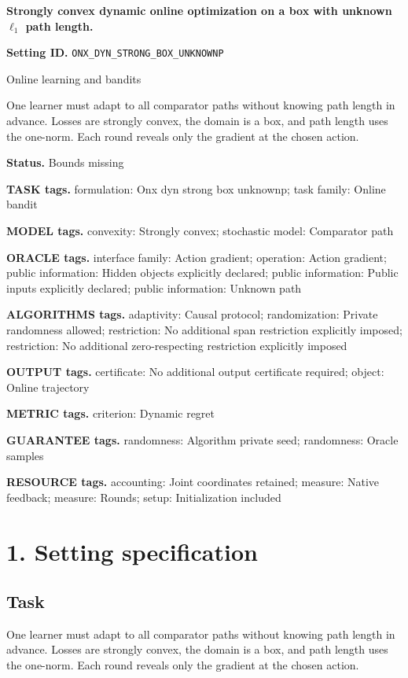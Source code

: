 \documentclass[10pt,a4paper]{article}
\begin{document}
\raggedright

{\LARGE\bfseries\sffamily\color{AtlasNavy} Strongly convex dynamic online optimization on a box with unknown $\ell _1$ path length.\par}\vspace{5pt}
\textbf{Setting ID.} \texttt{ONX\_\allowbreak{}DYN\_\allowbreak{}STRONG\_\allowbreak{}BOX\_\allowbreak{}UNKNOWNP}

Online learning and bandits

One learner must adapt to all comparator paths without knowing path length in advance. Losses are strongly convex, the domain is a box, and path length uses the one-norm. Each round reveals only the gradient at the chosen action.

\textbf{Status.} Bounds missing

\textbf{TASK tags.} formulation: Onx dyn strong box unknownp; task family: Online bandit

\textbf{MODEL tags.} convexity: Strongly convex; stochastic model: Comparator path

\textbf{ORACLE tags.} interface family: Action gradient; operation: Action gradient; public information: Hidden objects explicitly declared; public information: Public inputs explicitly declared; public information: Unknown path

\textbf{ALGORITHMS tags.} adaptivity: Causal protocol; randomization: Private randomness allowed; restriction: No additional span restriction explicitly imposed; restriction: No additional zero-respecting restriction explicitly imposed

\textbf{OUTPUT tags.} certificate: No additional output certificate required; object: Online trajectory

\textbf{METRIC tags.} criterion: Dynamic regret

\textbf{GUARANTEE tags.} randomness: Algorithm private seed; randomness: Oracle samples

\textbf{RESOURCE tags.} accounting: Joint coordinates retained; measure: Native feedback; measure: Rounds; setup: Initialization included

\section{1. Setting specification}
\subsection{Task}
One learner must adapt to all comparator paths without knowing path length in advance. Losses are strongly convex, the domain is a box, and path length uses the one-norm. Each round reveals only the gradient at the chosen action.
\end{document}
